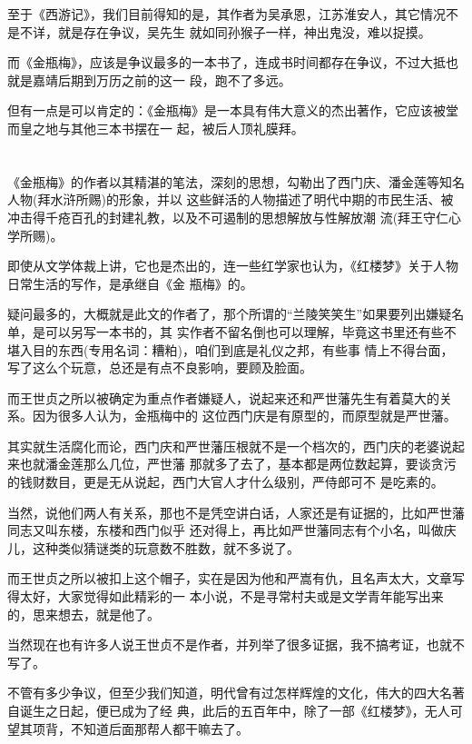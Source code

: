 \documentclass[11pt,a4paper,onecolumn]{article}
\begin{document}
至于《西游记》，我们目前得知的是，其作者为吴承恩，江苏淮安人，其它情况不是不详，就是存在争议，吴先生
就如同孙猴子一样，神出鬼没，难以捉摸。

而《金瓶梅》，应该是争议最多的一本书了，连成书时间都存在争议，不过大抵也就是嘉靖后期到万历之前的这一
段，跑不了多远。

但有一点是可以肯定的：《金瓶梅》是一本具有伟大意义的杰出著作，它应该被堂而皇之地与其他三本书摆在一
起，被后人顶礼膜拜。

\section[\thesection]{}

《金瓶梅》的作者以其精湛的笔法，深刻的思想，勾勒出了西门庆、潘金莲等知名人物(拜水浒所赐)的形象，并以
这些鲜活的人物描述了明代中期的市民生活、被冲击得千疮百孔的封建礼教，以及不可遏制的思想解放与性解放潮
流(拜王守仁心学所赐)。

即使从文学体裁上讲，它也是杰出的，连一些红学家也认为，《红楼梦》关于人物日常生活的写作，是承继自《金
瓶梅》的。

疑问最多的，大概就是此文的作者了，那个所谓的``兰陵笑笑生''如果要列出嫌疑名单，是可以另写一本书的，其
实作者不留名倒也可以理解，毕竟这书里还有些不堪入目的东西(专用名词：糟粕)，咱们到底是礼仪之邦，有些事
情上不得台面，写了这么个玩意，总还是有点不良影响，要顾及脸面。

而王世贞之所以被确定为重点作者嫌疑人，说起来还和严世藩先生有着莫大的关系。因为很多人认为，金瓶梅中的
这位西门庆是有原型的，而原型就是严世藩。

其实就生活腐化而论，西门庆和严世藩压根就不是一个档次的，西门庆的老婆说起来也就潘金莲那么几位，严世藩
那就多了去了，基本都是两位数起算，要谈贪污的钱财数目，更是无从说起，西门大官人才什么级别，严侍郎可不
是吃素的。

当然，说他们两人有关系，那也不是凭空讲白话，人家还是有证据的，比如严世藩同志又叫东楼，东楼和西门似乎
还对得上，再比如严世藩同志有个小名，叫做庆儿，这种类似猜谜类的玩意数不胜数，就不多说了。

而王世贞之所以被扣上这个帽子，实在是因为他和严嵩有仇，且名声太大，文章写得太好，大家觉得如此精彩的一
本小说，不是寻常村夫或是文学青年能写出来的，思来想去，就是他了。

当然现在也有许多人说王世贞不是作者，并列举了很多证据，我不搞考证，也就不写了。

不管有多少争议，但至少我们知道，明代曾有过怎样辉煌的文化，伟大的四大名著自诞生之日起，便已成为了经
典，此后的五百年中，除了一部《红楼梦》，无人可望其项背，不知道后面那帮人都干嘛去了。
\end{document}
